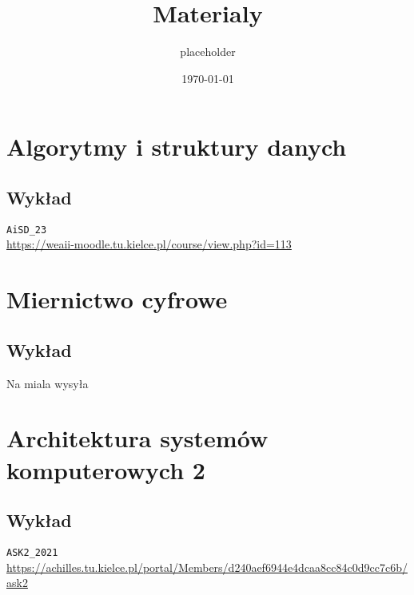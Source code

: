 \documentclass[11pt]{article}
\author{placeholder}
\date{\today}
\title{Materialy}
\begin{document}
\maketitle
\tableofcontents

\section{Algorytmy i struktury danych}
\label{sec:orgb5b42ec}
\subsection{Wykład}
\label{sec:org5cd7735}
\texttt{AiSD\_23}
\\[0pt]
\url{https://weaii-moodle.tu.kielce.pl/course/view.php?id=113}
\section{Miernictwo cyfrowe}
\label{sec:org75b23d7}
\subsection{Wykład}
\label{sec:org2f905b6}
Na miala wysyła
\section{Architektura systemów komputerowych 2}
\label{sec:org2d10f87}
\subsection{Wykład}
\label{sec:org0e519d6}
\texttt{ASK2\_2021}
\\[0pt]
\url{https://achilles.tu.kielce.pl/portal/Members/d240aef6944e4dcaa8cc84c0d9cc7c6b/ask2}
\end{document}
